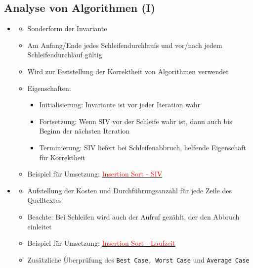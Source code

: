 \documentclass[
    ngerman,
    color=3b,
    load_common, %
    summary,
    boxarc,
]{tuda_summary}
\begin{document}
\subsection{Analyse von Algorithmen \textmd{(I)}}\label{Analyse von Algorithmen 1}
\begin{itemize}

    \item {}
          \begin{itemize}
              \item Sonderform der Invariante
              \item Am Anfang/Ende jedes Schleifendurchlaufs und vor/nach jedem Schleifendurchlauf gültig
              \item Wird zur Feststellung der Korrektheit von Algorithmen verwendet
              \item Eigenschaften:
                    \begin{itemize}
                        \item Initialisierung: Invariante ist vor jeder Iteration wahr
                        \item Fortsetzung: Wenn SIV vor der Schleife wahr ist, dann auch bis Beginn der nächsten Iteration
                        \item Terminierung: SIV liefert bei Schleifenabbruch, helfende Eigenschaft für Korrektheit
                    \end{itemize}
              \item Beispiel für Umsetzung: \hyperref[insSortSiv]{\textcolor{red}{Insertion Sort - SIV}}
          \end{itemize}

    \item {}
          \begin{itemize}
              \item Aufstellung der Kosten und Durchführungsanzahl für jede Zeile des Quelltextes
              \item Beachte: Bei Schleifen wird auch der Aufruf gezählt, der den Abbruch einleitet
              \item Beispiel für Umsetzung: \hyperref[insSortLaufzeit]{\textcolor{red}{Insertion Sort - Laufzeit}}
              \item Zusätzliche Überprüfung des \texttt{Best Case, Worst Case} und \texttt{Average Case}
          \end{itemize}


\end{itemize}
\end{document}
